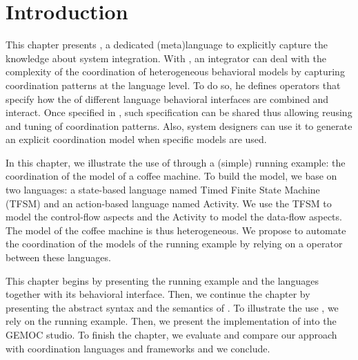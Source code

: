 \section{Introduction}
\label{sec:bcoolintro}
This chapter presents \bcool, a dedicated (meta)language to explicitly capture the knowledge about system integration. With \bcool, an integrator can deal with the complexity of the coordination of heterogeneous behavioral models by capturing coordination patterns at the language level. To do so, he defines operators that specify how the \dse of different language behavioral interfaces are combined and interact. Once specified in \bcool, such specification can be shared thus allowing reusing and tuning of coordination patterns. Also, system designers can use it to generate an explicit coordination model when specific models are used.    
	
In this chapter, we illustrate the use of \bcool through a (simple) running example: the coordination of the model of a coffee machine. To build the model, we base on two languages: a state-based language named Timed Finite State Machine (TFSM) and an action-based language named Activity. We use the TFSM to model the control-flow aspects and the Activity to model the data-flow aspects. The model of the coffee machine is thus heterogeneous. We propose to automate the coordination of the models of the running example by relying on a \bcool operator between these languages.

This chapter begins by presenting the running example and the languages together with its behavioral interface.  Then, we continue the chapter by presenting the abstract syntax and the semantics of \bcool. To illustrate the use \bcool, we rely on the running example. Then, we present the implementation of \bcool into the GEMOC studio. To finish the chapter, we evaluate and compare our approach with coordination languages and frameworks and we conclude.


